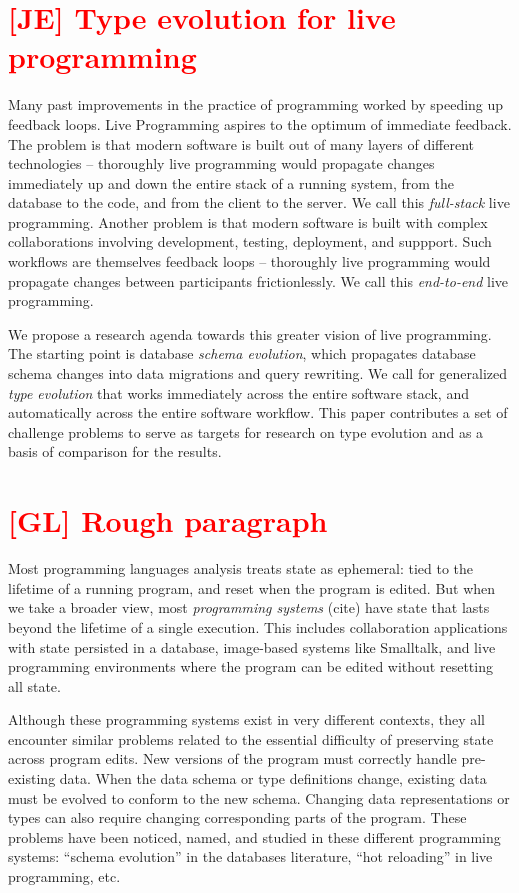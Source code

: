 \documentclass[english,submission]{programming}
\begin{document}
\section{\textcolor{red}{[JE] Type evolution for live programming}}

Many past improvements in the practice of programming worked by speeding up feedback loops. Live Programming aspires to the optimum of immediate feedback. The problem is that modern software is built out of many layers of different technologies -- thoroughly live programming would propagate changes immediately up and down the entire stack of a running system, from the database to the code, and from the client to the server. We call this \textit{full-stack} live programming. Another problem is that modern software is built with complex collaborations involving development, testing, deployment, and suppport. Such workflows are themselves feedback loops -- thoroughly live programming would propagate changes between participants frictionlessly. We call this \textit{end-to-end} live programming.

We propose a research agenda towards this greater vision of live programming. The starting point is database \textit{schema evolution}, which propagates database schema changes into data migrations and query rewriting. We call for generalized \textit{type evolution} that works immediately across the entire software stack, and automatically across the entire software workflow. This paper contributes a set of challenge problems to serve as targets for research on type evolution and as a basis of comparison for the results.

\section{\textcolor{red}{[GL] Rough paragraph}}

Most programming languages analysis treats state as ephemeral: tied to the lifetime of a running program, and reset when the program is edited. But when we take a broader view, most \textit{programming systems} (cite) have state that lasts beyond the lifetime of a single execution. This includes collaboration applications with state persisted in a database, image-based systems like Smalltalk, and live programming environments where the program can be edited without resetting all state.

Although these programming systems exist in very different contexts, they all encounter similar problems related to the essential difficulty of preserving state across program edits. New versions of the program must correctly handle pre-existing data. When the data schema or type definitions change, existing data must be evolved to conform to the new schema. Changing data representations or types can also require changing corresponding parts of the program. These problems have been noticed, named, and studied in these different programming systems: ``schema evolution'' in the databases literature, ``hot reloading'' in live programming, etc.
\end{document}
